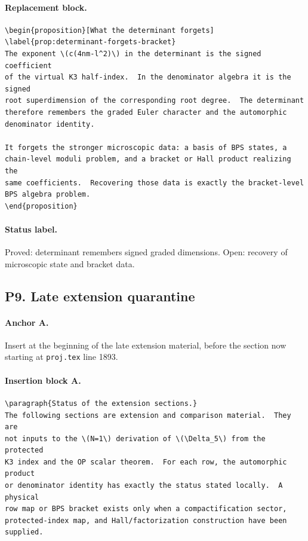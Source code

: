 \paragraph{Replacement block.}
\begin{verbatim}
\begin{proposition}[What the determinant forgets]
\label{prop:determinant-forgets-bracket}
The exponent \(c(4nm-l^2)\) in the determinant is the signed coefficient
of the virtual K3 half-index.  In the denominator algebra it is the signed
root superdimension of the corresponding root degree.  The determinant
therefore remembers the graded Euler character and the automorphic
denominator identity.

It forgets the stronger microscopic data: a basis of BPS states, a
chain-level moduli problem, and a bracket or Hall product realizing the
same coefficients.  Recovering those data is exactly the bracket-level
BPS algebra problem.
\end{proposition}
\end{verbatim}

\paragraph{Status label.}
Proved: determinant remembers signed graded dimensions.  Open: recovery
of microscopic state and bracket data.

\subsection{P9. Late extension quarantine}

\paragraph{Anchor A.}
Insert at the beginning of the late extension material, before the
section now starting at \texttt{proj.tex} line 1893.

\paragraph{Insertion block A.}
\begin{verbatim}
\paragraph{Status of the extension sections.}
The following sections are extension and comparison material.  They are
not inputs to the \(N=1\) derivation of \(\Delta_5\) from the protected
K3 index and the OP scalar theorem.  For each row, the automorphic product
or denominator identity has exactly the status stated locally.  A physical
row map or BPS bracket exists only when a compactification sector,
protected-index map, and Hall/factorization construction have been
supplied.
\end{verbatim}

